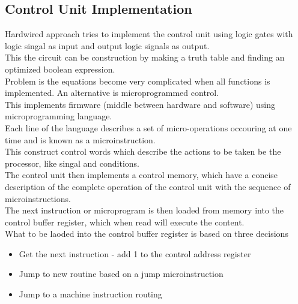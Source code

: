\documentclass[12pt, a4paper]{article}
\begin{document}
		\subsection{Control Unit Implementation}
			Hardwired approach tries to implement the control unit using logic gates with logic singal as input and output logic signals as output.\\
			This the circuit can be construction by making a truth table and finding an optimized boolean expression.\\
			Problem is the equations become very complicated when all functions is implemented.
			An alternative is microprogrammed control.\\
			This implements firmware (middle between hardware and software) using microprogramming language.\\
			Each line of the language describes a set of micro-operations occouring at one time and is known as a microinstruction.\\
			This construct control words which describe the actions to be taken be the processor, like singal and conditions.\\
			The control unit then implements a control memory, which have a concise description of the complete operation of the control unit with the sequence of microinstructions.\\
			The next instruction or microprogram is then loaded from memory into the control buffer register, which when read will execute the content.\\
			What to be laoded into the control buffer register is based on three decisions
			\begin{itemize}
				\item Get the next instruction - add 1 to the control address register
				\item Jump to new routine based on a jump microinstruction
				\item Jump to a machine instruction routing
			\end{itemize}
\end{document}
